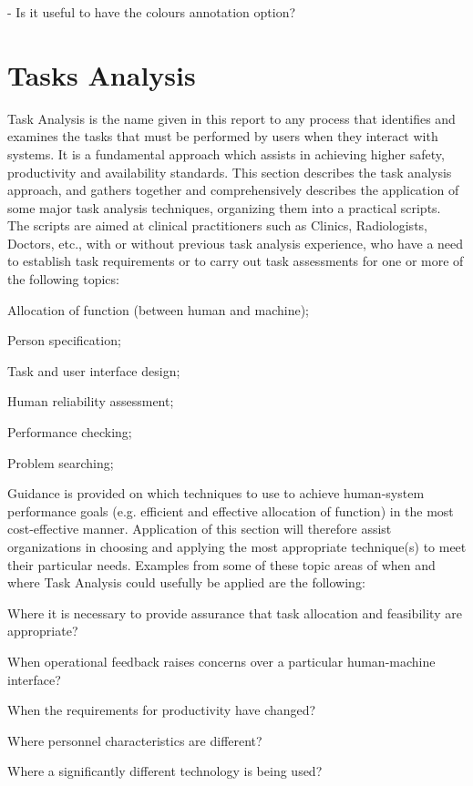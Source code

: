 - Is it useful to have the colours annotation option?

\section{Tasks Analysis}

Task Analysis is the name given in this report to any process that identifies and examines the tasks that must be performed by users when they interact with systems. It is a fundamental approach which assists in achieving higher safety, productivity and availability standards. This section describes the task analysis approach, and gathers together and comprehensively describes the application of some major task analysis techniques, organizing them into a practical scripts. The scripts are aimed at clinical practitioners such as Clinics, Radiologists, Doctors, etc., with or without previous task analysis experience, who have a need to establish task requirements or to carry out task assessments for one or more of the following topics:

 Allocation of function (between human and machine);

 Person specification;

 Task and user interface design;

 Human reliability assessment;

 Performance checking;

 Problem searching;

Guidance is provided on which techniques to use to achieve human-system performance goals (e.g. efficient and effective allocation of function) in the most cost-effective manner. Application of this section will therefore assist organizations in choosing and applying the most appropriate technique(s) to meet their particular needs. Examples from some of these topic areas of when and where Task Analysis could usefully be applied are the following:

 Where it is necessary to provide assurance that task allocation and feasibility are appropriate?

 When operational feedback raises concerns over a particular human-machine
interface?

 When the requirements for productivity have changed?

 Where personnel characteristics are different?

 Where a significantly different technology is being used?

